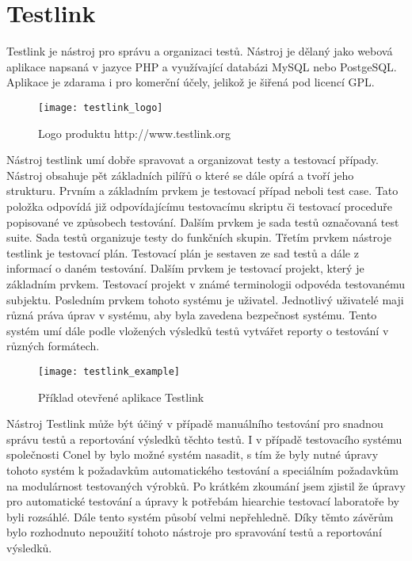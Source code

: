 \section{Testlink}
Testlink je nástroj pro správu a organizaci testů. Nástroj je dělaný jako webová aplikace napsaná v jazyce PHP a využívající databázi MySQL nebo PostgeSQL. Aplikace je zdarama i pro komerční účely, jelikož je šiřená pod licencí GPL.

\begin{figure}[h]
  \centering
  \texttt{[image: testlink\_logo]}
  \caption{Logo produktu http://www.testlink.org}
  \label{fig:testlink_logo}
\end{figure}

Nástroj testlink umí dobře spravovat a organizovat testy a testovací případy. Nástroj obsahuje pět základních pilířů o které se dále opírá a tvoří jeho strukturu. Prvním a základním prvkem je testovací případ neboli test case. Tato položka odpovídá již odpovídajícímu testovacímu skriptu či testovací proceduře popisované ve způsobech testování. Dalším prvkem je sada testů označovaná test suite. Sada testů organizuje testy do funkčních skupin. Třetím prvkem nástroje testlink je testovací plán. Testovací plán je sestaven ze sad testů a dále z informací o daném testování. Dalším prvkem je testovací projekt, který je základním prvkem. Testovací projekt v známé terminologii odpovéda testovanému subjektu. Posledním prvkem tohoto systému je uživatel. Jednotlivý uživatelé maji různá práva úprav v systému, aby byla zavedena bezpečnost systému. Tento systém umí dále podle vložených výsledků testů vytvářet reporty o testování v různých formátech.

\begin{figure}[h]
  \centering
  \texttt{[image: testlink\_example]}
  \caption{Příklad otevřené aplikace Testlink}
  \label{fig:testlink_example}
\end{figure}

Nástroj Testlink může být účiný v případě manuálního testování pro snadnou správu testů a reportování výsledků těchto testů. I v případě testovacího systému společnosti Conel by bylo možné systém nasadit, s tím že byly nutné úpravy tohoto systém k požadavkům automatického testování a speciálním požadavkům na modulárnost testovaných výrobků. Po krátkém zkoumání jsem zjistil že úpravy pro automatické testování a úpravy k potřebám hiearchie testovací laboratoře by byli rozsáhlé. Dále tento systém působí velmi nepřehledně. Díky těmto závěrům bylo rozhodnuto nepoužití tohoto nástroje pro spravování testů a reportování výsledků.


